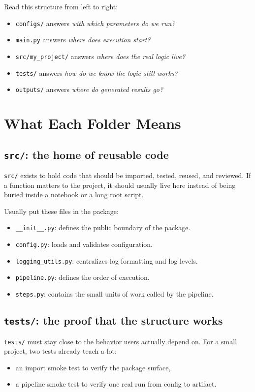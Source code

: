 \documentclass[11pt,oneside]{book}
\begin{document}
Read this structure from left to right:
\begin{itemize}
  \item \texttt{configs/} answers \textit{with which parameters do we run?}
  \item \texttt{main.py} answers \textit{where does execution start?}
  \item \texttt{src/my\_project/} answers \textit{where does the real logic live?}
  \item \texttt{tests/} answers \textit{how do we know the logic still works?}
  \item \texttt{outputs/} answers \textit{where do generated results go?}
\end{itemize}

\section*{What Each Folder Means}

\subsection*{\texttt{src/}: the home of reusable code}
\texttt{src/} exists to hold code that should be imported, tested, reused, and reviewed.  
If a function matters to the project, it should usually live here instead of being buried inside a notebook or a long root script.

Usually put these files in the package:
\begin{itemize}
  \item \texttt{\_\_init\_\_.py}: defines the public boundary of the package.
  \item \texttt{config.py}: loads and validates configuration.
  \item \texttt{logging\_utils.py}: centralizes log formatting and log levels.
  \item \texttt{pipeline.py}: defines the order of execution.
  \item \texttt{steps.py}: contains the small units of work called by the pipeline.
\end{itemize}

\subsection*{\texttt{tests/}: the proof that the structure works}
\texttt{tests/} must stay close to the behavior users actually depend on.  
For a small project, two tests already teach a lot:
\begin{itemize}
  \item an import smoke test to verify the package surface,
  \item a pipeline smoke test to verify one real run from config to artifact.
\end{itemize}
\end{document}
